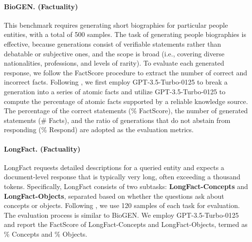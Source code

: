 \paragraph{BioGEN. (Factuality)}
This benchmark requires generating short biographies for particular people entities, with a total of 500 samples.
The task of generating people biographies is effective, because generations consist of verifiable statements rather than debatable or subjective ones, and the scope is broad (i.e., covering diverse nationalities, professions, and levels of rarity).
To evaluate each generated response, we follow the FactScore procedure to extract the number of correct and incorrect facts.
Following \citet{min2023factscore}, we first employ GPT-3.5-Turbo-0125 to break a generation into a series of atomic facts and utilize GPT-3.5-Turbo-0125 to compute the percentage of atomic facts supported by a reliable knowledge source.
The percentage of the correct statements (\% FactScore), the number of generated statements (\# Facts), and the ratio of generations that do not abstain from responding (\% Respond) are adopted as the evaluation metrics.

\paragraph{LongFact. (Factuality)}
LongFact requests detailed descriptions for a queried entity and expects a document-level response that is typically very long, often exceeding a thousand tokens.
Specifically, LongFact consists of two subtasks: \textbf{LongFact-Concepts} and \textbf{LongFact-Objects}, separated based on whether the questions ask about concepts or objects.
Following \citet{cheng2024integrativedecodingimprovefactuality}, we use 120 samples of each task for evaluation.
The evaluation process is similar to BioGEN.
We employ GPT-3.5-Turbo-0125 and report the FactScore of LongFact-Concepts and LongFact-Objects, termed as \% Concepts and \% Objects.

